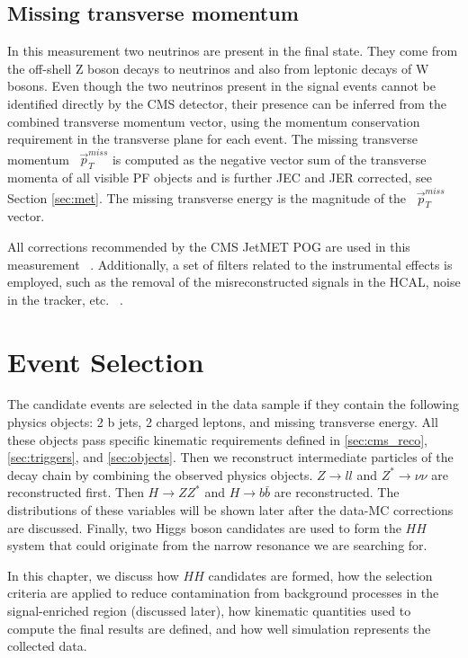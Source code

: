 \subsection{Missing transverse momentum}
In this measurement two neutrinos are present in the final state. They come from the off-shell Z boson decays to neutrinos and also from leptonic decays of W bosons. Even though the two neutrinos present in the signal events cannot be identified directly by the CMS detector, their presence can be inferred from the combined transverse momentum vector, using the momentum conservation requirement in the transverse plane for each event. The missing transverse momentum ~$\vec{p}^{miss}_T$ is computed as the negative vector sum of the transverse momenta of all visible PF objects and is further JEC and JER corrected, see Section \ref{sec:met}. The missing transverse energy \ETslash is the magnitude of the ~$\vec{p}^{miss}_T$ vector. 

All corrections recommended by the CMS JetMET POG are used in this measurement ~\cite{MissingETRun2Corrections}. Additionally, a set of filters related to the instrumental effects is employed, such as the removal of the misreconstructed signals in the HCAL, noise in the tracker, etc. ~\cite{MissingETOptionalFiltersRun2}. 

\section{Event Selection}\label{sec:selection}

The candidate events are selected in the data sample if they contain the following physics objects: 2 b jets, 2 charged leptons, and missing transverse energy. All these objects pass specific kinematic requirements defined in \ref{sec:cms_reco}, \ref{sec:triggers}, and \ref{sec:objects}. Then we reconstruct intermediate particles of the decay chain by combining the observed physics objects. $Z \to ll$ and $Z^* \to \nu \nu$ are reconstructed first. Then $H \to ZZ^*$ and $H \to b\bar{b}$ are reconstructed. The distributions of these variables will be shown later after the data-MC corrections are discussed. Finally, two Higgs boson candidates are used to form the $HH$ system that could originate from the narrow resonance we are searching for.

In this chapter, we discuss how $HH$ candidates are formed, how the selection criteria are applied to reduce contamination from background processes in the signal-enriched region (discussed later), how kinematic quantities used to compute the final results are defined, and how well simulation represents the collected data.

